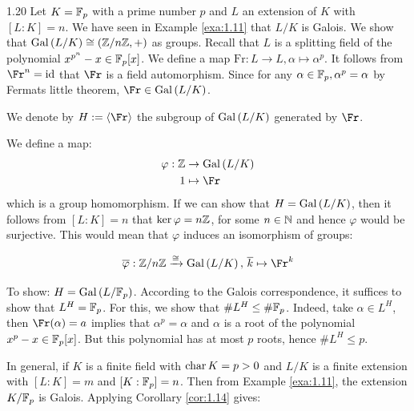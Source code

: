 \documentclass[twoside = false,	%
		headsepline,		%
		parskip = true,
		]{scrbook}						%
\begin{document}
    	\begin{example}{}{1.20}
    		Let $K= \mathbb F_p$ with a prime number $p$ and $L$ an extension of $K$ with $[L:K] = n$. We have seen in Example \ref{exa:1.11} that $L/K$ is Galois.
    		We show that $\mathrm{Gal}\left( L/K\right) \cong (\mathbb Z/n\mathbb Z,+)$ as groups.
    		Recall that $L$ is a splitting field of the polynomial $x^{p^n}-x \in \mathbb F_p[x]$. We define a map $\mathrm{Fr}: L \rightarrow L, \alpha \mapsto \alpha^p$. It follows from $\Fr^n = \id$ that $\Fr$ is a field automorphism. Since for any $\alpha \in \mathbb F_p, \alpha^p = \alpha$ by Fermats little theorem, $\Fr \in \Gal{L/K}$.
    		
    		We denote by $H:= \spitz{\Fr}$ the subgroup of $\mathrm{Gal}\left( L/K\right)$ generated by $\Fr$.
    		
    		We define a map:
    		\begin{equation*}
    			\begin{split}
    				\varphi: \Z &\rightarrow \Gal{L/K} \\
    						1 & \mapsto \Fr
    			\end{split}
    		\end{equation*}
    	which is a group homomorphism. If we can show that $H = \mathrm{Gal}\left( L/K\right)$, then it follows from $[L:K] = n$ that $\ker \varphi = n\mathbb Z$, for some $n \in \mathbb N$ and hence $\varphi$ would be surjective. This would mean that $\varphi$ induces an isomorphism of groups:
    	
    	\begin{equation*}
    		\overline{\varphi}: \Z/n\Z \xrightarrow{\cong} \Gal{L/K}, \, \overline{k} \mapsto \Fr^k
    	\end{equation*}
    	
    	To show: $H = \mathrm{Gal}\left( L/\mathbb F_p\right)$. According to the Galois correspondence, it suffices to show that $L^H = \mathbb F_p$. For this, we show that $\#L^H \leq \# \mathbb F_p$. Indeed, take $\alpha \in L^H$, then $\Fr(\alpha) = a$ implies that $\alpha^p = \alpha$ and $\alpha$ is a root of the polynomial $x^p - x \in \mathbb F_p[x]$. But this polynomial has at most $p$ roots, hence $\# L^H \leq p$.
    	
    	In general, if $K$ is a finite field with $\mathrm{char} \, K = p > 0$ and $L/K$ is a finite extension with $[L:K] = m$ and $[K:\mathbb F_p] = n$. Then from Example \ref{exa:1.11}, the extension $K/\mathbb F_p$ is Galois. Applying Corollary \ref{cor:1.14} gives: %
    	

\end{example}
\end{document}
